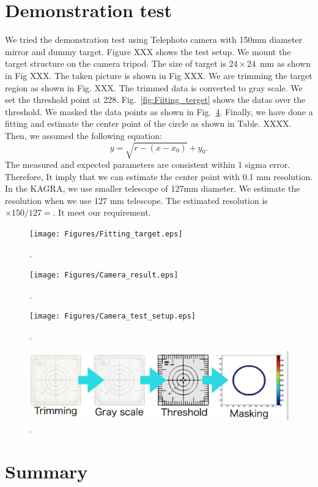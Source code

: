 \section{Demonstration test}
We tried the demonstration test using Telephoto camera with 150mm diameter mirror and dummy target.
Figure XXX shows the test setup. We mount the target structure on the camera tripod. The size of target is $24 \times 24$~mm as shown in Fig XXX. The taken picture is shown in Fig XXX.
We are trimming the target region as shown in Fig. XXX. The trimmed data is converted to gray scale. We set the threshold point at 228.
Fig.~\ref{fig:Fiiting_terget} shows the datas over the threshold.
We masked the data points as shown in Fig.~\ref{fig:Analysis_cam}.
Finally, we have done a fitting and estimate the center point of the circle as shown in Table. XXXX.
Then, we assumed the following equation:
\begin{equation}
y=\sqrt{r-(x-x_0)}+y_0.
\end{equation} 
The measured and expected parameters are consistent within 1 sigma error.
Therefore, It imply that we can estimate the center point with 0.1 mm resolution.
In the KAGRA, we use smaller telescope of 127mm diameter.
We estimate the resolution when we use 127 mm telescope.
The estimated resolution is $\times 150/127=$. It meet our requirement.

   \begin{figure}
\begin{center}
\texttt{[image: Figures/Fitting\_target.eps]}
\caption{.} 
\label{fig:Fitting_target} 
\end{center}
\end{figure}
   
   \begin{figure}
\begin{center}
\texttt{[image: Figures/Camera\_result.eps]}
\caption{.} 
\label{fig:Camera_result} 
\end{center}
\end{figure}

   \begin{figure}
\begin{center}
\texttt{[image: Figures/Camera\_test\_setup.eps]}
\caption{.} 
\label{fig:Camera_test_setup} 
\end{center}
\end{figure}

   \begin{figure}
\begin{center}
\includegraphics[width=14cm]{Figures/Analysis_cam.eps}
\caption{.} 
\label{fig:Analysis_cam} 
\end{center}
\end{figure}

\section{Summary}

 